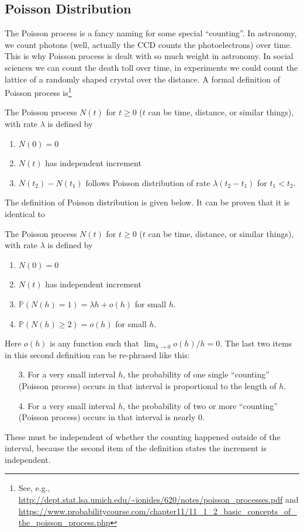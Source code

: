 \subsection{Poisson Distribution}
The Poisson process is a fancy naming for some special ``counting''. In astronomy, we count photons (well, actually the CCD counts the photoelectrons) over time. This is why Poisson process is dealt with so much weight in astronomy. In social sciences we can count the death toll over time, in experiments we could count the lattice of a randomly shaped crystal over the distance. A formal definition of Poisson process is\footnote{See, e.g., \url{http://dept.stat.lsa.umich.edu/~ionides/620/notes/poisson_processes.pdf} and \url{https://www.probabilitycourse.com/chapter11/11_1_2_basic_concepts_of_the_poisson_process.php}}

\begin{defn} \label{def: Pois1}
The Poisson process $ N(t) $ for $ t \ge 0 $ ($ t $ can be time, distance, or similar things), with rate $ \lambda $ is defined by
\begin{enumerate}
\item $ N(0) = 0 $
\item $ N(t) $ has independent increment
\item $ N(t_2) - N(t_1) $ follows Poisson distribution of rate $ \lambda (t_2 - t_1) $ for $ t_1 < t_2 $.
\end{enumerate}
\end{defn}

The definition of Poisson distribution is given below. It can be proven that it is identical to \newpage
\begin{defn} \label{def: Pois2}
The Poisson process $ N(t) $ for $ t \ge 0 $ ($ t $ can be time, distance, or similar things), with rate $ \lambda $ is defined by
  \begin{enumerate}
    \item $ N(0) = 0 $
    \item $ N(t) $ has independent increment
    \item $ \mathbb{P}(N(h) = 1) = \lambda h + o(h) $ for small $ h $.
    \item $ \mathbb{P}(N(h) \ge 2) = o(h) $ for small $ h $.
  \end{enumerate}
\end{defn}
Here $ o(h) $ is any function such that $ \lim_{h \rightarrow 0} o(h) / h = 0 $. The last two items in this second definition can be re-phrased like this:
\begin{itemize}
\item [3.] For a very small interval $ h $, the probability of one single ``counting'' (Poisson process) occurs in that interval is proportional to the length of $ h $.
\item [4.] For a very small interval $ h $, the probability of two or more ``counting'' (Poisson process) occurs in that interval is nearly 0.
\end{itemize}
These must be independent of whether the counting happened outside of the interval, because the second item of the definition states the increment is independent.


